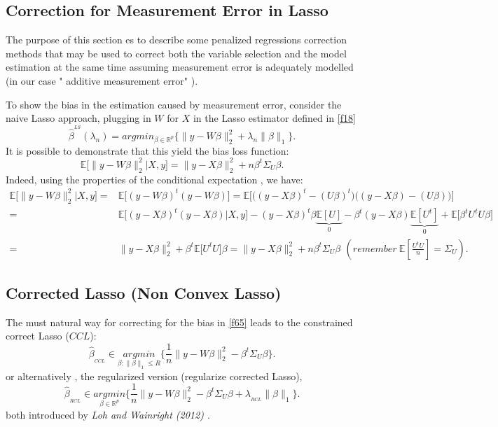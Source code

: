 \documentclass[12pt]{report}
\begin{document}
\subsection{Correction for Measurement Error in Lasso}
The purpose of this section es to describe some penalized regressions correction methods that may be used to correct both the variable selection and the model estimation at the same time assuming measurement error is adequately modelled (in our case " additive measurement error" ).

To show the bias in the estimation caused by measurement error, consider the naive Lasso approach, plugging in $W$ for $X$ in the Lasso estimator defined in \eqref{f18}
	\begin{equation}
	\hat{\beta}^{^{LS}}(\lambda_{n}) = argmin_{\beta \in \mathbb{R}^{p} } \bigg\{ \parallel y- W\beta \parallel^{2}_{2}+ \lambda_{n}\parallel \beta \parallel_{1}\bigg\}.
	\label{f64}
\end{equation}
It is possible to  demonstrate that this yield the bias loss function:
\begin{equation}
	\mathbb{E}\big[\parallel y- W\beta \parallel^{2}_{2}|X,y\big]=\parallel y- X\beta \parallel^{2}_{2}+n\beta^{t}\Sigma_{U}\beta.
	\label{f65}
\end{equation}
Indeed, using the properties of the conditional expectation , we have:
\begin{align*}
	\mathbb{E}\big[\parallel y- W\beta \parallel^{2}_{2}|X,y\big]=&\mathbb{E}\big[(y- W\beta)^{t}( y- W\beta)\big]=\mathbb{E}\bigg[\big(( y- X\beta)^{t}-(U\beta)^{t}\big)\big( (y- X\beta)-(U\beta)\big)\bigg]\\
	=&\mathbb{E}\big[( y- X\beta)^{t}( y- X\beta)|X,y\big]-( y- X\beta)^{t}\beta\underbrace{\mathbb{E}[U]}_{0}-\beta^{t}( y- X\beta)\underbrace{\mathbb{E}[U^{t}]}_{0}+\mathbb{E}\big[\beta^{t}U^{t}U\beta\big]\\
	=&	\parallel y- X\beta \parallel^{2}_{2}+\beta^{t}\mathbb{E}\big[U^{t}U\big]\beta=\parallel y- X\beta \parallel^{2}_{2}+n\beta^{t}\Sigma_{U}\beta\, \ (remember\ \mathbb{E}[\frac{U^{t}U}{n}]=\Sigma_{U}).
\end{align*}
\subsection{Corrected Lasso (Non Convex Lasso)}
The must natural way for correcting for the bias in \eqref{f65} leads to the constrained correct Lasso ($CCL$):
\begin{equation}
	\hat{\beta}_{_{CCL}}\in \underset{\beta:\parallel\beta\parallel_{1}\leq R}{argmin}\bigg\{\frac{1}{n}\parallel y- W\beta \parallel^{2}_{2}-\beta^{t}\Sigma_{U}\beta\bigg\}.
	\label{f66}
\end{equation}
or alternatively , the regularized version (regularize corrected Lasso),
\begin{equation}
		\hat{\beta}_{_{RCL}}\in \underset{\beta \in \mathbb{R}^{p}}{argmin}\bigg\{\frac{1}{n}\parallel y- W\beta \parallel^{2}_{2}-\beta^{t}\Sigma_{U}\beta+\lambda_{_{RCL}}\parallel\beta\parallel_{1}\bigg\}.
	\label{f67}
\end{equation}
both introduced by \textit{Loh and Wainright (2012) \cite{nref17}}.
\end{document}
